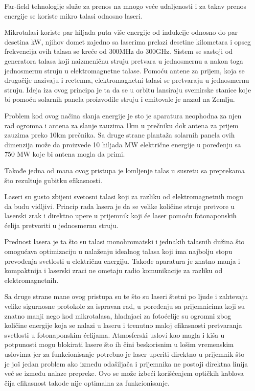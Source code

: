 \documentclass[a4paper]{article}
\begin{document}
Far-field tehnologije služe za prenos na mnogo veće udaljenosti i za takav prenos energije se koriste mikro talasi odnosno laseri.

Mikrotalasi koriste par hiljada puta više energije od indukcije odnosno do par desetina kW, njihov domet zajedno sa laserima prelazi desetine kilometara i opseg frekvencija ovih talasa se kreće od 300MHz do 300GHz. Sistem se sastoji od generatora talasa koji naizmeničnu struju pretvara u jednosmernu a nakon toga jednosmernu struju u elektromagnetne talase. Pomoću antene za prijem, koja se drugačije nazivaju i rectenna, elektromagnetni talasi se pretvaraju u jednosmernu struju. Ideja iza ovog principa je ta da se u orbitu lansiraju svemirske stanice koje bi pomoću solarnih panela proizvodile struju i emitovale je nazad na Zemlju.

Problem kod ovog načina slanja energije je sto je aparatura neophodna za njen rad ogromna i antena za slanje zauzima 1km u prečniku dok antena za prijem zauzima preko 10km prečnika. Sa druge strane plantaža solarnih panela ovih dimenzija može da proizvede 10 hiljada MW električne energije u poređenju sa 750 MW koje bi antena mogla da primi.

Takođe jedna od mana ovog pristupa je lomljenje talas u susretu sa preprekama što rezultuje gubitku efikasnosti.

Laseri su gusto zbijeni svetosni talasi koji za razliku od elektromagnetnih mogu da budu vidljivi. Princip rada lasera je da se velike količine struje pretvore u laserski zrak i direktno upere u prijemnik koji će laser pomoću fotonaponskih ćelija pretvoriti u jednosmernu struju.

Prednost lasera je ta što su talasi monohromatski i jednakih talasnih dužina što omogućava optimizaciju u nalaženju idealnog talasa koji ima najbolju stopu prevođenja svetlosti u električnu energiju. Takođe aparatura je znatno manja i kompaktnija i laserski zraci ne ometaju radio komunikacije za razliku od elektromagnetnih.

Sa druge strane mane ovog pristupa su te što su laseri štetni po ljude i zahtevaju velike sigurnosne protokole za ispravan rad, u poređenju sa prijemnicima koji su znatno manji nego kod mikrotalasa, hladnjaci za fotoćelije su ogromni zbog količine energije koja se nalazi u laseru i trenutno maloj efikasnosti pretvaranja svetlosti u fotonaponskim ćelijama. Atmosferski uslovi kao magla i kiša u potpunosti mogu blokirati lasere što ih čini beskorisnim u lošim vremenskim uslovima jer za funkcionisanje potrebno je laser uperiti direktno u prijemnik što je još jedan problem ako između odašiljača i prijemnika ne postoji direktna linija već se između nalaze prepreke. Ovo se može izbeći korišćenjem optičkih kablova čija efikasnost takođe nije optimalna za funkcionisanje.
\end{document}
